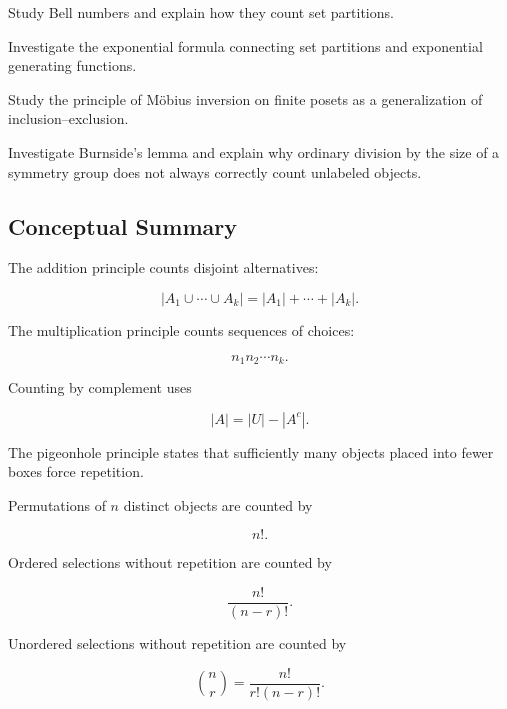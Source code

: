 \begin{exercise}[4]
Study Bell numbers and explain how they count set partitions.
\end{exercise}

\begin{exercise}[4]
Investigate the exponential formula connecting set partitions and
exponential generating functions.
\end{exercise}

\begin{exercise}[4]
Study the principle of Möbius inversion on finite posets as a
generalization of inclusion--exclusion.
\end{exercise}

\begin{exercise}[4]
Investigate Burnside's lemma and explain why ordinary division by the
size of a symmetry group does not always correctly count unlabeled
objects.
\end{exercise}

\subsection{Conceptual Summary}
\label{subsec:basic-counting-summary}

The addition principle counts disjoint alternatives:

\[
\boxed{
|A_1\cup\cdots\cup A_k|
=
|A_1|+\cdots+|A_k|.
}
\]

The multiplication principle counts sequences of choices:

\[
\boxed{
n_1n_2\cdots n_k.
}
\]

Counting by complement uses

\[
\boxed{
|A|
=
|U|-|A^c|.
}
\]

The pigeonhole principle states that sufficiently many objects placed
into fewer boxes force repetition.

Permutations of \(n\) distinct objects are counted by

\[
\boxed{
n!.
}
\]

Ordered selections without repetition are counted by

\[
\boxed{
\frac{n!}{(n-r)!}.
}
\]

Unordered selections without repetition are counted by

\[
\boxed{
\binom{n}{r}
=
\frac{n!}{r!(n-r)!}.
}
\]

